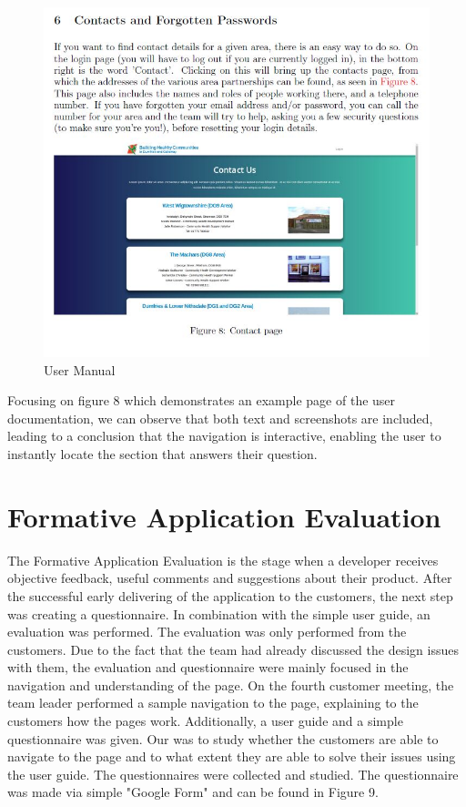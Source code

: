 \documentclass{l3proj}
\begin{document}
\begin{figure}
 \centerline{\includegraphics[width=\textwidth, height=\textheight, keepaspectratio]{usermanual.jpg}}
 \caption{User Manual }
\end{figure}

Focusing on figure 8 which demonstrates an example page of the user documentation, we can observe that both text and screenshots are included, leading to a conclusion that the navigation is interactive, enabling the user to instantly locate the section that answers their question. 

\section{Formative Application Evaluation}
\label{sec:appEval}

The Formative Application Evaluation is the stage when a developer receives objective feedback, useful comments and suggestions about their product.  After the successful early delivering of the application to the customers, the next step was creating a questionnaire. In combination with the simple user guide, an evaluation was performed. The evaluation was only performed from the customers. Due to the fact that the team had already discussed the design issues with them, the evaluation and questionnaire were mainly focused in the navigation and understanding of the page. On the  fourth customer meeting, the team leader performed a sample navigation to the page, explaining to the customers how the pages work.  Additionally, a user guide and a simple questionnaire was given. Our was to study whether the customers are able to navigate to the page and to what extent they are able to solve their issues using the user guide. The questionnaires were collected and studied.  The questionnaire was made via simple "Google Form" and can be found in Figure 9.
\end{document}
